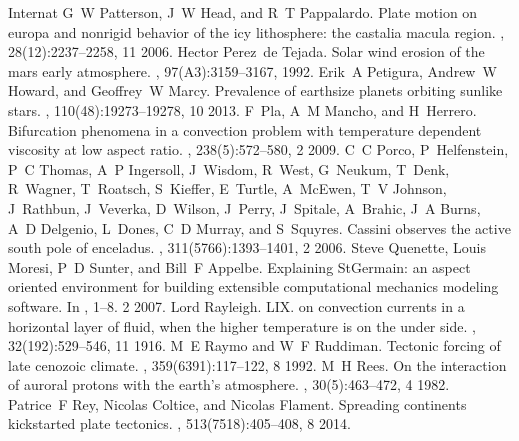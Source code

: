 \documentclass[letterpaper,10pt,english]{jupyterBook}
\begin{document}
\begin{sphinxthebibliography}{Internat}
\sphinxAtStartPar
G W Patterson, J W Head, and R T Pappalardo. Plate motion on europa and nonrigid behavior of the icy lithosphere: the castalia macula region. , 28(12):2237–2258, 11 2006.
\sphinxAtStartPar
Hector Perez de Tejada. Solar wind erosion of the mars early atmosphere. , 97(A3):3159–3167, 1992.
\sphinxAtStartPar
Erik A Petigura, Andrew W Howard, and Geoffrey W Marcy. Prevalence of earth\sphinxhyphen{}size planets orbiting sun\sphinxhyphen{}like stars. , 110(48):19273–19278, 10 2013.
\sphinxAtStartPar
F Pla, A M Mancho, and H Herrero. Bifurcation phenomena in a convection problem with temperature dependent viscosity at low aspect ratio. , 238(5):572–580, 2 2009.
\sphinxAtStartPar
C C Porco, P Helfenstein, P C Thomas, A P Ingersoll, J Wisdom, R West, G Neukum, T Denk, R Wagner, T Roatsch, S Kieffer, E Turtle, A McEwen, T V Johnson, J Rathbun, J Veverka, D Wilson, J Perry, J Spitale, A Brahic, J A Burns, A D Delgenio, L Dones, C D Murray, and S Squyres. Cassini observes the active south pole of enceladus. , 311(5766):1393–1401, 2 2006.
\sphinxAtStartPar
Steve Quenette, Louis Moresi, P D Sunter, and Bill F Appelbe. Explaining StGermain: an aspect oriented environment for building extensible computational mechanics modeling software. In , 1–8. 2 2007.
\sphinxAtStartPar
Lord Rayleigh. LIX. on convection currents in a horizontal layer of fluid, when the higher temperature is on the under side. , 32(192):529–546, 11 1916.
\sphinxAtStartPar
M E Raymo and W F Ruddiman. Tectonic forcing of late cenozoic climate. , 359(6391):117–122, 8 1992.
\sphinxAtStartPar
M H Rees. On the interaction of auroral protons with the earth's atmosphere. , 30(5):463–472, 4 1982.
\sphinxAtStartPar
Patrice F Rey, Nicolas Coltice, and Nicolas Flament. Spreading continents kick\sphinxhyphen{}started plate tectonics. , 513(7518):405–408, 8 2014.

\end{sphinxthebibliography}
\end{document}
